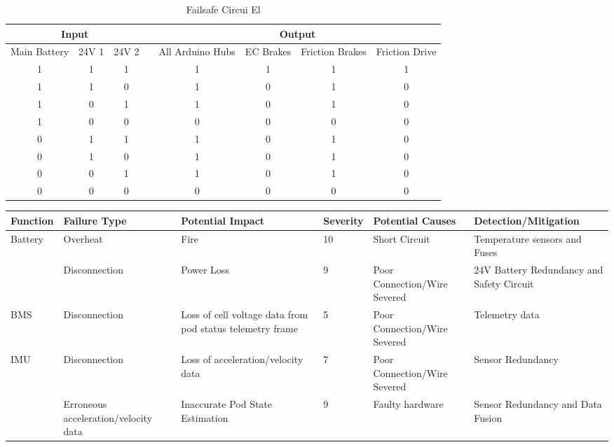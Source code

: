 \documentclass[hidelinks, twoside]{report}
\begin{document}
\begin{appendices}
\begin{table}[]
\centering
\caption{Failsafe Circui El}
\label{my-label}
\begin{tabular}{ccclcccc}
\hline
\multicolumn{3}{c}{Input}    &  & \multicolumn{4}{c}{Output}                                      \\ \hline
Main Battery & 24V 1 & 24V 2 &  & All Arduino Hubs & EC Brakes & Friction Brakes & Friction Drive \\ \hline
1            & 1     & 1     &  & 1                & 1         & 1               & 1              \\
1            & 1     & 0     &  & 1                & 0         & 1               & 0              \\
1            & 0     & 1     &  & 1                & 0         & 1               & 0              \\
1            & 0     & 0     &  & 0                & 0         & 0               & 0              \\
0            & 1     & 1     &  & 1                & 0         & 1               & 0              \\
0            & 1     & 0     &  & 1                & 0         & 1               & 0              \\
0            & 0     & 1     &  & 1                & 0         & 1               & 0              \\
0            & 0     & 0     &  & 0                & 0         & 0               & 0              \\ \hline
\end{tabular}
\end{table}

\begin{table}
\centering
  \begin{tabular}{@{}p{2cm}p{2cm}p{3cm}p{1cm}p{3cm}p{3cm}@{}} \toprule
    Function & Failure Type & Potential Impact & Severity & Potential Causes & Detection/Mitigation \\ \midrule
    \multirow{2}{*}{Battery} & Overheat & Fire & 10 & Short Circuit & Temperature sensors and Fuses \\
    & Disconnection & Power Loss & 9 & Poor Connection/Wire Severed & 24V Battery Redundancy and Safety Circuit \\
    BMS & Disconnection & Loss of cell voltage data from pod status telemetry frame & 5 & Poor Connection/Wire Severed & Telemetry data \\
    \multirow{2}{*}{IMU} & Disconnection & Loss of acceleration/velocity data & 7 & Poor Connection/Wire Severed & Sensor Redundancy \\
    & Erroneous acceleration/velocity data & Inaccurate Pod State Estimation & 9 & Faulty hardware & Sensor Redundancy and Data Fusion \\


\end{tabular}
\end{table}
\end{appendices}
\end{document}
